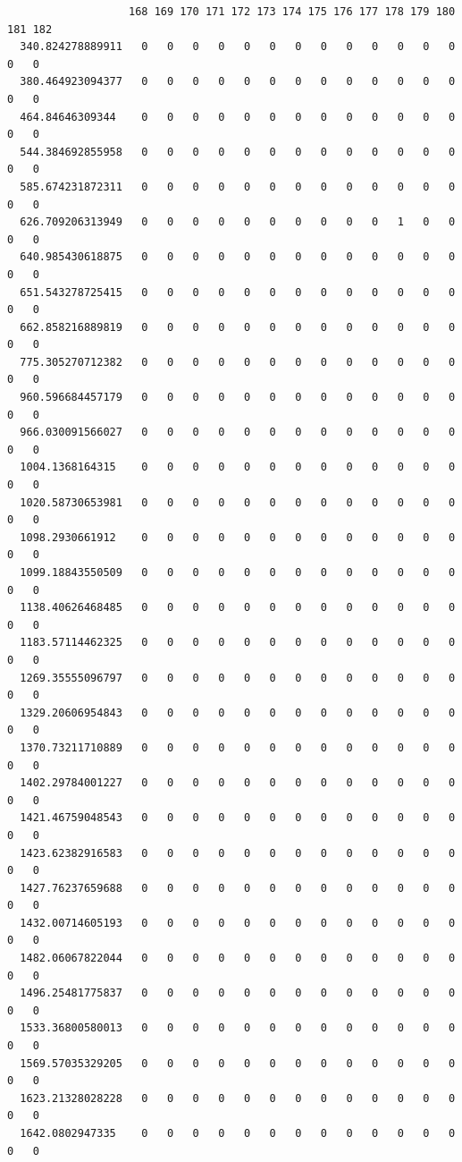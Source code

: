 \documentclass[
  letterpaper,
  DIV=11,
  numbers=noendperiod]{scrartcl}
\begin{document}
\begin{verbatim}
                   168 169 170 171 172 173 174 175 176 177 178 179 180 181 182
  340.824278889911   0   0   0   0   0   0   0   0   0   0   0   0   0   0   0
  380.464923094377   0   0   0   0   0   0   0   0   0   0   0   0   0   0   0
  464.84646309344    0   0   0   0   0   0   0   0   0   0   0   0   0   0   0
  544.384692855958   0   0   0   0   0   0   0   0   0   0   0   0   0   0   0
  585.674231872311   0   0   0   0   0   0   0   0   0   0   0   0   0   0   0
  626.709206313949   0   0   0   0   0   0   0   0   0   0   1   0   0   0   0
  640.985430618875   0   0   0   0   0   0   0   0   0   0   0   0   0   0   0
  651.543278725415   0   0   0   0   0   0   0   0   0   0   0   0   0   0   0
  662.858216889819   0   0   0   0   0   0   0   0   0   0   0   0   0   0   0
  775.305270712382   0   0   0   0   0   0   0   0   0   0   0   0   0   0   0
  960.596684457179   0   0   0   0   0   0   0   0   0   0   0   0   0   0   0
  966.030091566027   0   0   0   0   0   0   0   0   0   0   0   0   0   0   0
  1004.1368164315    0   0   0   0   0   0   0   0   0   0   0   0   0   0   0
  1020.58730653981   0   0   0   0   0   0   0   0   0   0   0   0   0   0   0
  1098.2930661912    0   0   0   0   0   0   0   0   0   0   0   0   0   0   0
  1099.18843550509   0   0   0   0   0   0   0   0   0   0   0   0   0   0   0
  1138.40626468485   0   0   0   0   0   0   0   0   0   0   0   0   0   0   0
  1183.57114462325   0   0   0   0   0   0   0   0   0   0   0   0   0   0   0
  1269.35555096797   0   0   0   0   0   0   0   0   0   0   0   0   0   0   0
  1329.20606954843   0   0   0   0   0   0   0   0   0   0   0   0   0   0   0
  1370.73211710889   0   0   0   0   0   0   0   0   0   0   0   0   0   0   0
  1402.29784001227   0   0   0   0   0   0   0   0   0   0   0   0   0   0   0
  1421.46759048543   0   0   0   0   0   0   0   0   0   0   0   0   0   0   0
  1423.62382916583   0   0   0   0   0   0   0   0   0   0   0   0   0   0   0
  1427.76237659688   0   0   0   0   0   0   0   0   0   0   0   0   0   0   0
  1432.00714605193   0   0   0   0   0   0   0   0   0   0   0   0   0   0   0
  1482.06067822044   0   0   0   0   0   0   0   0   0   0   0   0   0   0   0
  1496.25481775837   0   0   0   0   0   0   0   0   0   0   0   0   0   0   0
  1533.36800580013   0   0   0   0   0   0   0   0   0   0   0   0   0   0   0
  1569.57035329205   0   0   0   0   0   0   0   0   0   0   0   0   0   0   0
  1623.21328028228   0   0   0   0   0   0   0   0   0   0   0   0   0   0   0
  1642.0802947335    0   0   0   0   0   0   0   0   0   0   0   0   0   0   0

\end{verbatim}
\end{document}
